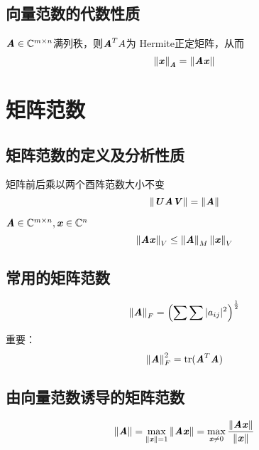 \subsection{向量范数的代数性质}
\label{sub:向量范数的代数性质}

\begin{definition}
    $\MA \in \SetC^{m \times n}$满列秩，则$\MA^TA$为 \textrm{Hermite}正定矩阵，从而
    $$
    \norm{\Vx}_{\MA} = \norm{\MA \Vx}
    $$
\end{definition}
\section{矩阵范数}
\label{sec:矩阵范数}

\subsection{矩阵范数的定义及分析性质}
\label{sub:矩阵范数的定义及分析性质}

\begin{definition}[(广义)矩阵范数是酉不变的]
    矩阵前后乘以两个酉阵范数大小不变
    $$
    \norm{\MU \MA \MV} = \norm{\MA}
    $$
\end{definition}

\begin{definition}[矩阵范数与向量范数相容]
    $\MA \in \SetC^{m \times n}, \Vx \in \SetC^{n}$
    $$
    \norm{\MA \Vx}_{V} \leq \norm{\MA}_M \norm{\Vx}_V
    $$
\end{definition}


\subsection{常用的矩阵范数}
\label{sub:常用的矩阵范数}

\begin{definition}
    $$
    \norm{\MA}_F = \left ( \sum \sum |a_{ij}|^2 \right)^{\frac{1}{2}}
    $$
\end{definition}

重要：
$$
\norm{\MA}_F^2 = \mathrm{tr}(\MA^T\MA)
$$

\subsection{由向量范数诱导的矩阵范数}
\label{sub:由向量范数诱导的矩阵范数}

\begin{definition}[有向量范数诱导的矩阵范数或算子范数]
    $$
    \norm{\MA} = \max_{\norm{\Vx}=1} \norm{\MA \Vx} = \max_{\Vx \neq 0} \frac{\norm{\MA\Vx}}{\norm{\Vx}}
    $$
\end{definition}

